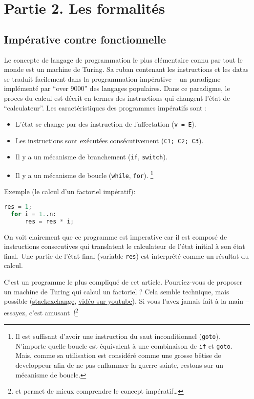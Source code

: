 \section*{Partie 2. Les formalités}

\subsection*{Impérative contre fonctionnelle}
Le concepte de langage de programmation le plus elémentaire connu par tout le monde est un machine de Turing.
Sa ruban contenant les instructions et les datas se traduit facilement dans la programmation impérative -- un paradigme implémenté par ``over 9000'' des langages populaires.
Dans ce paradigme, le proces du calcul est décrit en termes des instructions qui changent l'état de ``calculateur''.
Les caractéristiques des programmes impératifs sont :
\begin{itemize}
	\item L'état se change par des instruction de l'affectation (\verb|v = E|).
	\item Les instructions sont exécutées consécutivement (\verb|C1; C2; C3|).
	\item Il y a un mécanisme de branchement (\verb|if|, \verb|switch|).
	\item Il y a un mécanisme de boucle (\verb|while|, \verb|for|).
	\footnote{Il est suffisant d'avoir une instruction du saut inconditionnel (\verb|goto|). N'importe quelle boucle est équivalent à une combinaison de \verb|if| et \verb|goto|. Mais, comme sa utilisation est considéré comme une grosse bêtise de developpeur afin de ne pas enflammer la guerre sainte, restons sur un mécanisme de boucle.}
\end{itemize}
Exemple (le calcul d'un factoriel impératif):
\begin{lstlisting}[language=Python]
  res = 1;
  for i = 1..n:
      res = res * i;
\end{lstlisting}
On voit clairement que ce programme est imperative car il est composé de instructions consecutives qui translatent le calculateur de l'état initial à son état final.
Une partie de l'état final (variable \verb|res|) est interprété comme un résultat du calcul.

C'est un programme le plus compliqué de cet article.
Pourriez-vous de proposer un machine de Turing qui calcul un factoriel ?
Cela semble technique, mais possible (\href{https://math.stackexchange.com/questions/1153376/construct-a-turing-machine-for-factorialunary}{stackexchange}, \href{https://youtu.be/h77-wb44Uvg}{vidéo sur youtube}).
Si vous l'avez jamais fait à la main -- essayez, c'est amusant~!\footnote{et permet de mieux comprendre le concept impératif\ldots}

